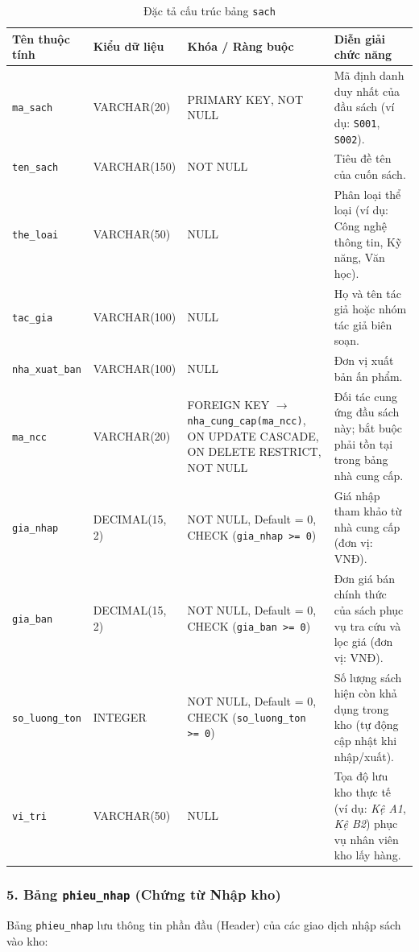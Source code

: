 \documentclass[12pt,a4paper]{article}
\begin{document}
\begin{table}[H]
\centering
\small
\renewcommand{\arraystretch}{1.2}
\begin{tabularx}{\textwidth}{|>{\raggedright\arraybackslash}p{3.0cm}|>{\raggedright\arraybackslash}p{2.6cm}|>{\raggedright\arraybackslash}p{3.8cm}|>{\raggedright\arraybackslash}X|}
\hline
\textbf{Tên thuộc tính} & \textbf{Kiểu dữ liệu} & \textbf{Khóa / Ràng buộc} & \textbf{Diễn giải chức năng} \\
\hline
\texttt{ma\_sach} & VARCHAR(20) & PRIMARY KEY, NOT NULL & Mã định danh duy nhất của đầu sách (ví dụ: \texttt{S001}, \texttt{S002}). \\
\hline
\texttt{ten\_sach} & VARCHAR(150) & NOT NULL & Tiêu đề tên của cuốn sách. \\
\hline
\texttt{the\_loai} & VARCHAR(50) & NULL & Phân loại thể loại (ví dụ: Công nghệ thông tin, Kỹ năng, Văn học). \\
\hline
\texttt{tac\_gia} & VARCHAR(100) & NULL & Họ và tên tác giả hoặc nhóm tác giả biên soạn. \\
\hline
\texttt{nha\_xuat\_ban} & VARCHAR(100) & NULL & Đơn vị xuất bản ấn phẩm. \\
\hline
\texttt{ma\_ncc} & VARCHAR(20) & FOREIGN KEY $\rightarrow$ \texttt{nha\_cung\_cap(ma\_ncc)}, ON UPDATE CASCADE, ON DELETE RESTRICT, NOT NULL & Đối tác cung ứng đầu sách này; bắt buộc phải tồn tại trong bảng nhà cung cấp. \\
\hline
\texttt{gia\_nhap} & DECIMAL(15, 2) & NOT NULL, Default = 0, CHECK (\texttt{gia\_nhap >= 0}) & Giá nhập tham khảo từ nhà cung cấp (đơn vị: VNĐ). \\
\hline
\texttt{gia\_ban} & DECIMAL(15, 2) & NOT NULL, Default = 0, CHECK (\texttt{gia\_ban >= 0}) & Đơn giá bán chính thức của sách phục vụ tra cứu và lọc giá (đơn vị: VNĐ). \\
\hline
\texttt{so\_luong\_ton} & INTEGER & NOT NULL, Default = 0, CHECK (\texttt{so\_luong\_ton >= 0}) & Số lượng sách hiện còn khả dụng trong kho (tự động cập nhật khi nhập/xuất). \\
\hline
\texttt{vi\_tri} & VARCHAR(50) & NULL & Tọa độ lưu kho thực tế (ví dụ: \textit{Kệ A1}, \textit{Kệ B2}) phục vụ nhân viên kho lấy hàng. \\
\hline
\end{tabularx}
\caption{Đặc tả cấu trúc bảng \texttt{sach}}
\label{tab:csdl-sach}
\end{table}

\subsubsection*{5. Bảng \texttt{phieu\_nhap} (Chứng từ Nhập kho)}
Bảng \texttt{phieu\_nhap} lưu thông tin phần đầu (Header) của các giao dịch nhập sách vào kho:
\end{document}
